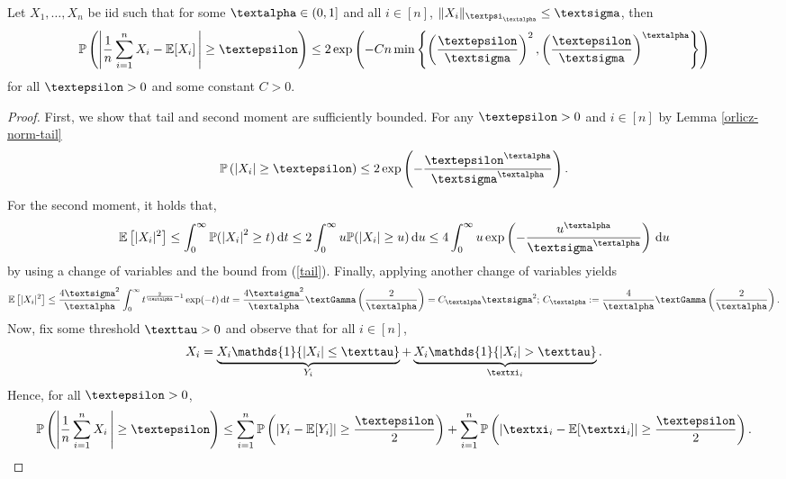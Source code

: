 \documentclass[openany]{book}
\begin{document}
\begin{lemma}\label{bernstein-corollary-2}
Let $X_1,\dots,X_n$ be iid such that for some $\galpha \in (0,1]$ and all $i\in [n]$, $\|X_i\|_{\gpsi_{\galpha}}\leq \gsigma$, then
\begin{equation*}
    \mathbb P\left(\left\vert\frac{1}{n}\sum_{i=1}^nX_i-\mathbb E[X_i]\,\right\vert \geq \gepsilon\right)\leq 2\exp\left(-Cn\min\left\{\left(\frac{\gepsilon}{\gsigma}\right)^{2}, \left(\frac{\gepsilon}{\gsigma}\right)^{\galpha}\right\}\right)
\end{equation*}
for all $\gepsilon > 0$ and some constant $C>0$.
\begin{proof}
First, we show that tail and second moment are sufficiently bounded. For any $\gepsilon>0$ and $i\in [n]$ by Lemma \ref{orlicz-norm-tail}
\begin{equation}\label{tail}
    \mathbb P\left(\vert X_i\vert \geq \gepsilon \right)\leq 2\exp\left(-\frac{\gepsilon^{\galpha}}{\gsigma^{\galpha}}\right).
\end{equation}
For the second moment, it holds that,
\begin{equation*}
\begin{split}
    \mathbb E\left[\vert X_i\vert ^2\right]\leq \int_0^\infty\mathbb P(\left\vert X_i\right\vert ^2\geq t)\,\mathrm dt\leq 2\int_0^\infty u\mathbb P(\vert X_i\vert \geq u)\,\mathrm du\leq 4\int_0^\infty u\exp\left(-\frac{u^{\galpha}}{\gsigma^{\galpha}}\right)\,\mathrm du
\end{split}
\end{equation*}
by using a change of variables and the bound from (\ref{tail}). Finally, applying another change of variables yields
\begin{equation}\label{sec_mom}
    \mathbb E\left[\vert X_i\vert ^2\right]\leq\frac{4\gsigma^2}{\galpha}\int_0^\infty t^{\frac{2}{\galpha}- 1}\exp(-t)\,\mathrm dt=\frac{4\gsigma^2}{\galpha}\gGamma\left(\frac{2}{\galpha}\right)=C_{\galpha}\gsigma^2;\, C_{\galpha}:=\frac{4}{\galpha}\gGamma\left(\frac{2}{\galpha}\right).
\end{equation}
Now, fix some threshold $\gtau > 0$ and observe that for all $i\in [n]$,
\begin{equation*}
    X_i=\underbrace{X_i \mathds{1}\{\vert X_i\vert \leq \gtau\}}_{Y_i}+ \underbrace{X_i \mathds{1}\{\vert X_i\vert > \gtau\}}_{\gxi_i}.
\end{equation*}
Hence, for all $\gepsilon>0$, 
\begin{equation*}
    \mathbb P\left(\left\vert\frac{1}{n}\sum_{i=1}^nX_i\,\right\vert \geq \gepsilon\right)\leq \sum_{i=1}^n\mathbb P\left(\left\vert Y_i - \mathbb E[Y_i] \right \vert \geq \frac{\gepsilon}{2}\right) + \sum_{i=1}^n\mathbb P\left(\left\vert \gxi_i - \mathbb E[\gxi_i] \right \vert \geq \frac{\gepsilon}{2}\right).

\end{equation*}
\end{proof}
\end{lemma}
\end{document}
